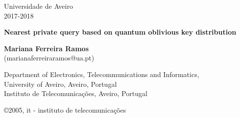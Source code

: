\documentclass[5pt]{article}
\newcommand{\br}[1]{{\textbf{\color{itred} #1}}}%
\begin{document}
\begin{titlepage}  

\color{itblue} \sffamily \noindent \small
\hspace*{1cm}  Universidade de Aveiro\\ %
\hspace*{1cm}  2017-2018\\ %

\vspace*{1cm}
\begin{center}
    \color{black} \sffamily \noindent \Large
    \br{Nearest private query based on quantum oblivious key distribution\\}
\end{center}
\vspace{6mm}
\begin{center}
    \color{black}
    \textbf{Mariana Ferreira Ramos\\}
    {(marianaferreiraramos@ua.pt)}
\end{center}

\vspace{0.0mm}
\scriptsize
\begin{center}
Department of Electronics, Telecommunications and Informatics,\\
University of Aveiro, Aveiro, Portugal\\
Instituto de Telecomunica\c{c}\~{o}es, Aveiro, Portugal\\
\end{center}

\vspace{1.0cm}
\hspace*{13.2cm}\tiny \copyright 2005, it - instituto de telecomunica\c{c}\~{o}es\hfill

\end{titlepage}


\renewcommand{\headsep}{-25pt}
\end{document}
